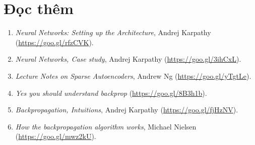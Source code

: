  
\newpage 
\section{Đọc thêm}
\begin{enumerate}
    \item \textit{Neural Networks: Setting up the Architecture}, Andrej Karpathy
    (\url{https://goo.gl/rfzCVK}). 

    \item \textit{Neural Networks, Case study}, Andrej Karpathy
    (\url{https://goo.gl/3ihCxL}).
 
    \item \textit{Lecture Notes on Sparse Autoencoders}, Andrew Ng
    (\url{https://goo.gl/yTgtLe}).
 
    \item \textit{Yes you should understand backprop} (\url{https://goo.gl/8B3h1b}). 
 
    \item \textit{Backpropagation, Intuitions}, Andrej Karpathy
    (\url{https://goo.gl/fjHzNV}).
 
    \item \textit{How the backpropagation algorithm works}, Michael Nielsen
    (\url{https://goo.gl/mwz2kU}). 
\end{enumerate}



 
